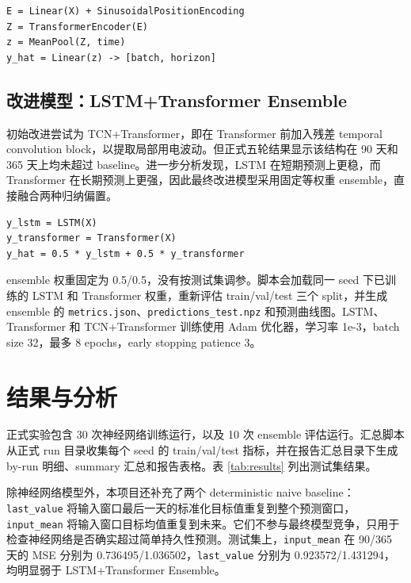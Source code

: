 \documentclass[11pt,a4paper]{article}
\begin{document}
\begin{center}
\begin{minipage}{0.82\textwidth}
\begin{verbatim}
E = Linear(X) + SinusoidalPositionEncoding
Z = TransformerEncoder(E)
z = MeanPool(Z, time)
y_hat = Linear(z) -> [batch, horizon]
\end{verbatim}
\end{minipage}
\end{center}

\subsection{改进模型：LSTM+Transformer Ensemble}

初始改进尝试为 TCN+Transformer，即在 Transformer 前加入残差 temporal convolution block，以提取局部用电波动。但正式五轮结果显示该结构在 90 天和 365 天上均未超过 baseline。进一步分析发现，LSTM 在短期预测上更稳，而 Transformer 在长期预测上更强，因此最终改进模型采用固定等权重 ensemble，直接融合两种归纳偏置。

\begin{center}
\begin{minipage}{0.82\textwidth}
\begin{verbatim}
y_lstm = LSTM(X)
y_transformer = Transformer(X)
y_hat = 0.5 * y_lstm + 0.5 * y_transformer
\end{verbatim}
\end{minipage}
\end{center}

ensemble 权重固定为 0.5/0.5，没有按测试集调参。脚本会加载同一 seed 下已训练的 LSTM 和 Transformer 权重，重新评估 train/val/test 三个 split，并生成 ensemble 的 \texttt{metrics.json}、\texttt{predictions\_test.npz} 和预测曲线图。LSTM、Transformer 和 TCN+Transformer 训练使用 Adam 优化器，学习率 1e-3，batch size 32，最多 8 epochs，early stopping patience 3。

\section{结果与分析}

正式实验包含 30 次神经网络训练运行，以及 10 次 ensemble 评估运行。汇总脚本从正式 run 目录收集每个 seed 的 train/val/test 指标，并在报告汇总目录下生成 by-run 明细、summary 汇总和报告表格。表 \ref{tab:results} 列出测试集结果。

除神经网络模型外，本项目还补充了两个 deterministic naive baseline：\texttt{last\_value} 将输入窗口最后一天的标准化目标值重复到整个预测窗口，\texttt{input\_mean} 将输入窗口目标均值重复到未来。它们不参与最终模型竞争，只用于检查神经网络是否确实超过简单持久性预测。测试集上，\texttt{input\_mean} 在 90/365 天的 MSE 分别为 0.736495/1.036502，\texttt{last\_value} 分别为 0.923572/1.431294，均明显弱于 LSTM+Transformer Ensemble。
\end{document}
